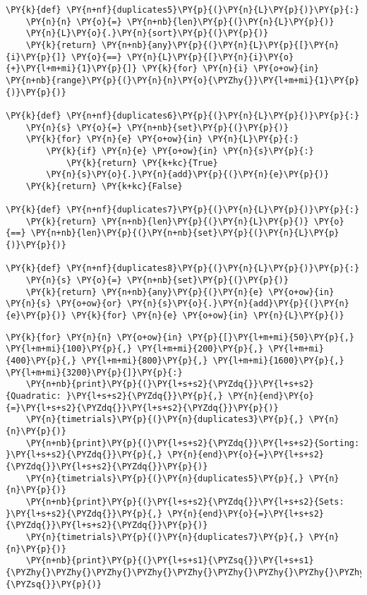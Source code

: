 \begin{Verbatim}[commandchars=\\\{\}]
\PY{k}{def} \PY{n+nf}{duplicates5}\PY{p}{(}\PY{n}{L}\PY{p}{)}\PY{p}{:}
    \PY{n}{n} \PY{o}{=} \PY{n+nb}{len}\PY{p}{(}\PY{n}{L}\PY{p}{)}
    \PY{n}{L}\PY{o}{.}\PY{n}{sort}\PY{p}{(}\PY{p}{)}
    \PY{k}{return} \PY{n+nb}{any}\PY{p}{(}\PY{n}{L}\PY{p}{[}\PY{n}{i}\PY{p}{]} \PY{o}{==} \PY{n}{L}\PY{p}{[}\PY{n}{i}\PY{o}{+}\PY{l+m+mi}{1}\PY{p}{]} \PY{k}{for} \PY{n}{i} \PY{o+ow}{in} \PY{n+nb}{range}\PY{p}{(}\PY{n}{n}\PY{o}{\PYZhy{}}\PY{l+m+mi}{1}\PY{p}{)}\PY{p}{)}

\PY{k}{def} \PY{n+nf}{duplicates6}\PY{p}{(}\PY{n}{L}\PY{p}{)}\PY{p}{:}
    \PY{n}{s} \PY{o}{=} \PY{n+nb}{set}\PY{p}{(}\PY{p}{)}
    \PY{k}{for} \PY{n}{e} \PY{o+ow}{in} \PY{n}{L}\PY{p}{:}
        \PY{k}{if} \PY{n}{e} \PY{o+ow}{in} \PY{n}{s}\PY{p}{:}
            \PY{k}{return} \PY{k+kc}{True}
        \PY{n}{s}\PY{o}{.}\PY{n}{add}\PY{p}{(}\PY{n}{e}\PY{p}{)}
    \PY{k}{return} \PY{k+kc}{False}

\PY{k}{def} \PY{n+nf}{duplicates7}\PY{p}{(}\PY{n}{L}\PY{p}{)}\PY{p}{:}
    \PY{k}{return} \PY{n+nb}{len}\PY{p}{(}\PY{n}{L}\PY{p}{)} \PY{o}{==} \PY{n+nb}{len}\PY{p}{(}\PY{n+nb}{set}\PY{p}{(}\PY{n}{L}\PY{p}{)}\PY{p}{)}

\PY{k}{def} \PY{n+nf}{duplicates8}\PY{p}{(}\PY{n}{L}\PY{p}{)}\PY{p}{:}
    \PY{n}{s} \PY{o}{=} \PY{n+nb}{set}\PY{p}{(}\PY{p}{)}
    \PY{k}{return} \PY{n+nb}{any}\PY{p}{(}\PY{n}{e} \PY{o+ow}{in} \PY{n}{s} \PY{o+ow}{or} \PY{n}{s}\PY{o}{.}\PY{n}{add}\PY{p}{(}\PY{n}{e}\PY{p}{)} \PY{k}{for} \PY{n}{e} \PY{o+ow}{in} \PY{n}{L}\PY{p}{)}
\end{Verbatim}



\begin{Verbatim}[commandchars=\\\{\}]
\PY{k}{for} \PY{n}{n} \PY{o+ow}{in} \PY{p}{[}\PY{l+m+mi}{50}\PY{p}{,} \PY{l+m+mi}{100}\PY{p}{,} \PY{l+m+mi}{200}\PY{p}{,} \PY{l+m+mi}{400}\PY{p}{,} \PY{l+m+mi}{800}\PY{p}{,} \PY{l+m+mi}{1600}\PY{p}{,} \PY{l+m+mi}{3200}\PY{p}{]}\PY{p}{:}
    \PY{n+nb}{print}\PY{p}{(}\PY{l+s+s2}{\PYZdq{}}\PY{l+s+s2}{Quadratic: }\PY{l+s+s2}{\PYZdq{}}\PY{p}{,} \PY{n}{end}\PY{o}{=}\PY{l+s+s2}{\PYZdq{}}\PY{l+s+s2}{\PYZdq{}}\PY{p}{)}
    \PY{n}{timetrials}\PY{p}{(}\PY{n}{duplicates3}\PY{p}{,} \PY{n}{n}\PY{p}{)}
    \PY{n+nb}{print}\PY{p}{(}\PY{l+s+s2}{\PYZdq{}}\PY{l+s+s2}{Sorting:   }\PY{l+s+s2}{\PYZdq{}}\PY{p}{,} \PY{n}{end}\PY{o}{=}\PY{l+s+s2}{\PYZdq{}}\PY{l+s+s2}{\PYZdq{}}\PY{p}{)}
    \PY{n}{timetrials}\PY{p}{(}\PY{n}{duplicates5}\PY{p}{,} \PY{n}{n}\PY{p}{)}
    \PY{n+nb}{print}\PY{p}{(}\PY{l+s+s2}{\PYZdq{}}\PY{l+s+s2}{Sets:      }\PY{l+s+s2}{\PYZdq{}}\PY{p}{,} \PY{n}{end}\PY{o}{=}\PY{l+s+s2}{\PYZdq{}}\PY{l+s+s2}{\PYZdq{}}\PY{p}{)}
    \PY{n}{timetrials}\PY{p}{(}\PY{n}{duplicates7}\PY{p}{,} \PY{n}{n}\PY{p}{)}
    \PY{n+nb}{print}\PY{p}{(}\PY{l+s+s1}{\PYZsq{}}\PY{l+s+s1}{\PYZhy{}\PYZhy{}\PYZhy{}\PYZhy{}\PYZhy{}\PYZhy{}\PYZhy{}\PYZhy{}\PYZhy{}\PYZhy{}\PYZhy{}\PYZhy{}\PYZhy{}\PYZhy{}\PYZhy{}\PYZhy{}\PYZhy{}\PYZhy{}\PYZhy{}\PYZhy{}\PYZhy{}\PYZhy{}\PYZhy{}\PYZhy{}\PYZhy{}\PYZhy{}\PYZhy{}}\PY{l+s+s1}{\PYZsq{}}\PY{p}{)}
\end{Verbatim}


